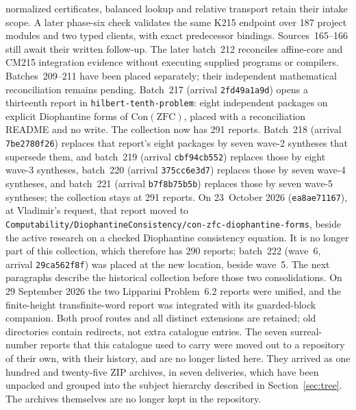\documentclass[11pt]{article}
\newcommand{\dir}[1]{\texttt{#1}}
\begin{document}
normalized certificates, balanced lookup and relative transport retain their
intake scope. A later phase-six check validates the same K215 endpoint over
187 project modules and two typed clients, with exact predecessor bindings.
Sources~165--166 still await their written follow-up. The later batch~212
reconciles affine-core and CM215 integration evidence without executing supplied
programs or compilers. Batches~209--211 have been placed separately; their
independent mathematical reconciliation remains pending.
Batch~217 (arrival \texttt{2fd49a1a9d}) opens a thirteenth report in
\dir{hilbert-tenth-problem}: eight independent packages on explicit
Diophantine forms of $\mathrm{Con}(\mathrm{ZFC})$, placed with a
reconciliation README and no write.  The collection now has 291 reports.
Batch~218 (arrival \texttt{7be2780f26}) replaces that report's eight
packages by seven wave-2 syntheses that supersede them, and batch~219
(arrival \texttt{cbf94cb552}) replaces those by eight wave-3 syntheses,
batch~220 (arrival \texttt{375cc6e3d7}) replaces those by seven
wave-4 syntheses, and batch~221 (arrival \texttt{b7f8b75b5b}) replaces
those by seven wave-5 syntheses; the collection stays at 291 reports.
On 23~October 2026 (\texttt{ea8ae71167}), at Vladimir's request, that report
moved to \dir{Computability/DiophantineConsistency/con-zfc-diophantine-forms},
beside the active research on a checked Diophantine consistency equation.
It is no longer part of this collection, which therefore has 290 reports;
batch~222 (wave~6, arrival \texttt{29ca562f8f}) was placed at the new
location, beside wave~5.
The next paragraphs describe the historical collection before those two
consolidations. On 29 September 2026 the two Lipparini Problem~6.2 reports
were unified, and the finite-height transfinite-word report was integrated
with its guarded-block companion. Both proof routes and all distinct
extensions are retained; old directories contain redirects, not extra
catalogue entries.  The seven surreal-number reports that this catalogue
used to carry were moved out to a repository of their own, with their history,
and are no longer listed here.  They arrived as one hundred and twenty-five ZIP
archives, in seven deliveries, which have been unpacked and grouped into the
subject hierarchy described in Section~\ref{sec:tree}.  The archives themselves
are no longer kept in the repository.
\end{document}
